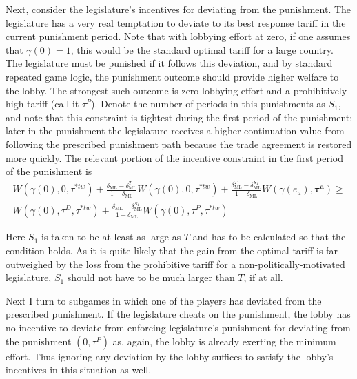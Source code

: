 \documentclass[authoryear, review]{elsarticle}
\newcommand{\bta}{\bm{\tau^a}}
\newcommand{\ga}{\gamma}
\newcommand{\de}{\delta}
\begin{document}
Next, consider the legislature's incentives for deviating from the punishment. The legislature has a very real temptation to deviate to its best response tariff in the current punishment period. Note that with lobbying effort at zero, if one assumes that $\gamma(0) = 1$, this would be the standard optimal tariff for a large country. The legislature must be punished if it follows this deviation, and by standard repeated game logic, the punishment outcome should provide higher welfare to the lobby. The strongest such outcome is zero lobbying effort and a prohibitively-high tariff (call it $\tau^P$). Denote the number of periods in this punishments as $S_1$, and note that this constraint is tightest during the first period of the punishment; later in the punishment the legislature receives a higher continuation value from following the prescribed punishment path because the trade agreement is restored more quickly. The relevant portion of the incentive constraint in the first period of the punishment is 
\begin{multline}
		W(\ga(0),0,\tau^{*tw}) + \frac{\de_\text{ML} - \de_\text{ML}^{T}}{1-\de_\text{ML}}W(\ga(0),0,\tau^{*tw}) + \frac{\de^{T}_\text{ML} - \de_\text{ML}^{S_1}}{1-\de_\text{ML}}W(\ga(e_a),\bta) \geq \\ W(\ga(0),\tau^D,\tau^{*tw}) + \frac{\de_\text{ML} - \de_\text{ML}^{S_1}}{1-\de_\text{ML}}W(\ga(0),\tau^P,\tau^{*tw})
		\label{eq:legpunasym}
\end{multline}

Here $S_1$ is taken to be at least as large as $T$ and has to be calculated so that the condition holds. As it is quite likely that the gain from the optimal tariff is far outweighed by the loss from the prohibitive tariff for a non-politically-motivated legislature, $S_1$ should not have to be much larger than $T$, if at all.

Next I turn to subgames in which one of the players has deviated from the prescribed punishment. If the legislature cheats on the punishment, the lobby has no incentive to deviate from enforcing legislature's punishment for deviating from the punishment $\left(0,\tau^P\right)$ as, again, the lobby is already exerting the minimum effort. Thus ignoring any deviation by the lobby suffices to satisfy the lobby's incentives in this situation as well.
\end{document}
